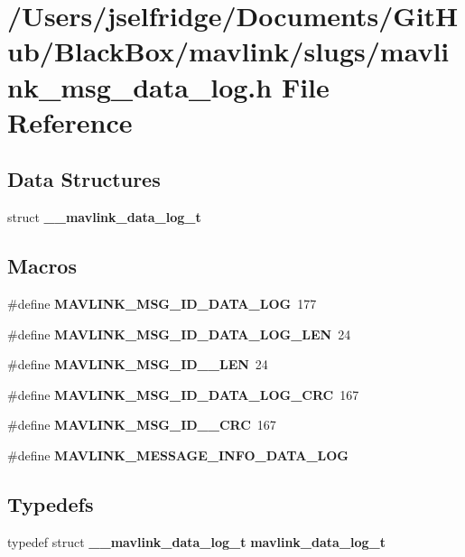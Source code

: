 \section{/\+Users/jselfridge/\+Documents/\+Git\+Hub/\+Black\+Box/mavlink/slugs/mavlink\+\_\+msg\+\_\+data\+\_\+log.h File Reference}
\label{mavlink__msg__data__log_8h}
\subsection*{Data Structures}
\begin{DoxyCompactItemize}
\item 
struct \textbf{ \+\_\+\+\_\+mavlink\+\_\+data\+\_\+log\+\_\+t}
\end{DoxyCompactItemize}
\subsection*{Macros}
\begin{DoxyCompactItemize}
\item 
\#define \textbf{ M\+A\+V\+L\+I\+N\+K\+\_\+\+M\+S\+G\+\_\+\+I\+D\+\_\+\+D\+A\+T\+A\+\_\+\+L\+OG}~177
\item 
\#define \textbf{ M\+A\+V\+L\+I\+N\+K\+\_\+\+M\+S\+G\+\_\+\+I\+D\+\_\+\+D\+A\+T\+A\+\_\+\+L\+O\+G\+\_\+\+L\+EN}~24
\item 
\#define \textbf{ M\+A\+V\+L\+I\+N\+K\+\_\+\+M\+S\+G\+\_\+\+I\+D\+\_\+\_\+\+L\+EN}~24
\item 
\#define \textbf{ M\+A\+V\+L\+I\+N\+K\+\_\+\+M\+S\+G\+\_\+\+I\+D\+\_\+\+D\+A\+T\+A\+\_\+\+L\+O\+G\+\_\+\+C\+RC}~167
\item 
\#define \textbf{ M\+A\+V\+L\+I\+N\+K\+\_\+\+M\+S\+G\+\_\+\+I\+D\+\_\+\_\+\+C\+RC}~167
\item 
\#define \textbf{ M\+A\+V\+L\+I\+N\+K\+\_\+\+M\+E\+S\+S\+A\+G\+E\+\_\+\+I\+N\+F\+O\+\_\+\+D\+A\+T\+A\+\_\+\+L\+OG}
\end{DoxyCompactItemize}
\subsection*{Typedefs}
\begin{DoxyCompactItemize}
\item 
typedef struct \textbf{ \+\_\+\+\_\+mavlink\+\_\+data\+\_\+log\+\_\+t} \textbf{ mavlink\+\_\+data\+\_\+log\+\_\+t}
\end{DoxyCompactItemize}


